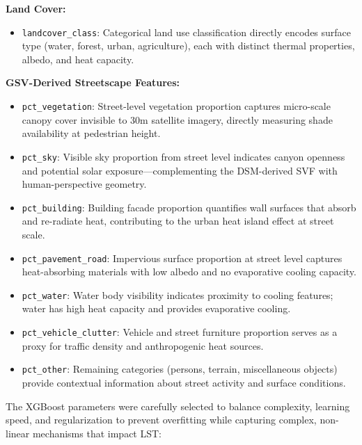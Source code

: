 \documentclass[
]{article}
\providecommand{\tightlist}{%
  \setlength{\itemsep}{0pt}\setlength{\parskip}{0pt}}
\begin{document}
\textbf{Land Cover:}

\begin{itemize}
\tightlist
\item \texttt{landcover\_class}: Categorical land use classification directly encodes surface type (water, forest, urban, agriculture), each with distinct thermal properties, albedo, and heat capacity.
\end{itemize}

\textbf{GSV-Derived Streetscape Features:}

\begin{itemize}
\item \texttt{pct\_vegetation}: Street-level vegetation proportion captures micro-scale canopy cover invisible to 30m satellite imagery, directly measuring shade availability at pedestrian height.
\item \texttt{pct\_sky}: Visible sky proportion from street level indicates canyon openness and potential solar exposure---complementing the DSM-derived SVF with human-perspective geometry.
\item \texttt{pct\_building}: Building facade proportion quantifies wall surfaces that absorb and re-radiate heat, contributing to the urban heat island effect at street scale.
\item \texttt{pct\_pavement\_road}: Impervious surface proportion at street level captures heat-absorbing materials with low albedo and no evaporative cooling capacity.
\item \texttt{pct\_water}: Water body visibility indicates proximity to cooling features; water has high heat capacity and provides evaporative cooling.
\item \texttt{pct\_vehicle\_clutter}: Vehicle and street furniture proportion serves as a proxy for traffic density and anthropogenic heat sources.
\item \texttt{pct\_other}: Remaining categories (persons, terrain, miscellaneous objects) provide contextual information about street activity and surface conditions.
\end{itemize}

The XGBoost parameters were carefully selected to balance complexity, learning speed, and regularization to prevent overfitting while capturing complex, non-linear mechanisms that impact LST:
\end{document}
